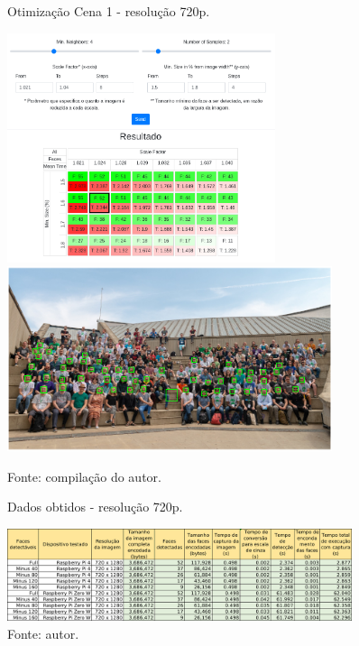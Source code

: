 \begin{figure}[H]
    \centering
    \caption[Otimização Cena 1 - resolução 720p.]{Otimização Cena 1 - resolução 720p.}
    \includegraphics[width=0.70\textwidth]{Cap4_Experimentos_Realizados/Figures/cena1_param_720p_matriz.jpg}
    \includegraphics[width=0.85\textwidth]{Cap4_Experimentos_Realizados/Figures/cena1_param_720p_faces.jpg}
    \caption*{Fonte: compilação do autor.\footnotemark[\value{footnote}]}
    \label{fig:otimizacaoCena1_720p}
\end{figure}

\begin{figure}
    \centering
    \caption[Dados obtidos - resolução 720p.]{Dados obtidos - resolução 720p.}
    \includegraphics[width=0.90\textwidth]{Cap4_Experimentos_Realizados/Figures/cena1_dados_720p_br.jpg}
    \caption*{Fonte: autor.}
    \label{fig:dadosCena1_720p}
\end{figure}


